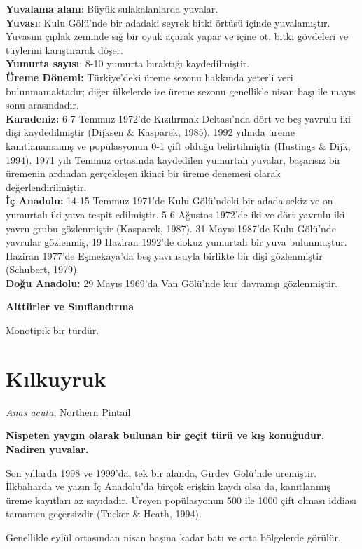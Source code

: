 \documentclass[
  a4paper,
  DIV=11,
  numbers=noendperiod]{scrreprt}
\begin{document}
\textbf{Yuvalama alanı}: Büyük sulakalanlarda yuvalar.\\
\textbf{Yuvası}: Kulu Gölü'nde bir adadaki seyrek bitki örtüsü içinde
yuvalamıştır. Yuvasını çıplak zeminde sığ bir oyuk açarak yapar ve içine
ot, bitki gövdeleri ve tüylerini karıştırarak döşer.\\
\textbf{Yumurta sayısı}: 8-10 yumurta bıraktığı kaydedilmiştir.\\
\textbf{Üreme Dönemi:} Türkiye'deki üreme sezonu hakkında yeterli veri
bulunmamaktadır; diğer ülkelerde ise üreme sezonu genellikle nisan başı
ile mayıs sonu arasındadır.\\
\textbf{Karadeniz:} 6-7 Temmuz 1972'de Kızılırmak Deltası'nda dört ve
beş yavrulu iki dişi kaydedilmiştir (Dijksen \& Kasparek, 1985). 1992
yılında üreme kanıtlanamamış ve popülasyonun 0-1 çift olduğu
belirtilmiştir (Hustings \& Dijk, 1994). 1971 yılı Temmuz ortasında
kaydedilen yumurtalı yuvalar, başarısız bir üremenin ardından
gerçekleşen ikinci bir üreme denemesi olarak değerlendirilmiştir.\\
\textbf{İç Anadolu:} 14-15 Temmuz 1971'de Kulu Gölü'ndeki bir adada
sekiz ve on yumurtalı iki yuva tespit edilmiştir. 5-6 Ağustos 1972'de
iki ve dört yavrulu iki yavru grubu gözlenmiştir (Kasparek, 1987). 31
Mayıs 1987'de Kulu Gölü'nde yavrular gözlenmiş, 19 Haziran 1992'de dokuz
yumurtalı bir yuva bulunmuştur. Haziran 1977'de Eşmekaya'da beş
yavrusuyla birlikte bir dişi gözlenmiştir (Schubert, 1979).\\
\textbf{Doğu Anadolu:} 29 Mayıs 1969'da Van Gölü'nde kur davranışı
gözlenmiştir.

\textbf{Alttürler ve Sınıflandırma}

Monotipik bir türdür.

\section{Kılkuyruk}\label{kux131lkuyruk}

\emph{Anas acuta}, Northern Pintail

\textbf{Nispeten yaygın olarak bulunan bir geçit türü ve kış konuğudur.
Nadiren yuvalar.}

Son yıllarda 1998 ve 1999'da, tek bir alanda, Girdev Gölü'nde üremiştir.
İlkbaharda ve yazın İç Anadolu'da birçok erişkin kaydı olsa da,
kanıtlanmış üreme kayıtları az sayıdadır. Üreyen popülasyonun 500 ile
1000 çift olması iddiası tamamen geçersizdir (Tucker \& Heath, 1994).

Genellikle eylül ortasından nisan başına kadar batı ve orta bölgelerde
görülür.
\end{document}
